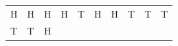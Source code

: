 {\begin{tabular}[t]{|l|l|l|l|l|l|l|l|l|l|}
        H &
        H &
        H &
        H &
        T &
        H &
        H &
        T &
        T &
        T%
     \tabularnewline\cline{1-1}\cline{2-2}\cline{3-3}\cline{4-4}\cline{5-5}\cline{6-6}\cline{7-7}\cline{8-8}\cline{9-9}\cline{10-10}
        T &
        T &
        H &

\end{tabular}}
